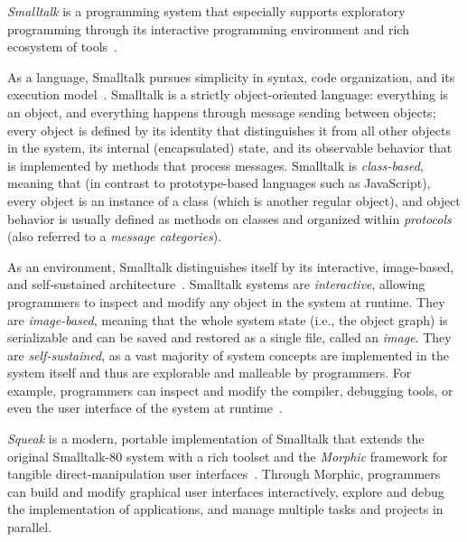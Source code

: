 \emph{Smalltalk} is a programming system that especially supports exploratory programming through its interactive programming environment and rich ecosystem of tools~\cite{ingalls2020evolution}.

As a language, Smalltalk pursues simplicity in syntax, code organization, and its execution model~\cite{goldberg1983smalltalk}.
Smalltalk is a strictly object-oriented language: everything is an object, and everything happens through message sending between objects; every object is defined by its identity that distinguishes it from all other objects in the system, its internal (encapsulated) state, and its observable behavior that is implemented by methods that process messages.
Smalltalk is \emph{class-based}, meaning that (in contrast to prototype-based languages such as JavaScript), every object is an instance of a class (which is another regular object), and object behavior is usually defined as methods on classes and organized within \emph{protocols} (also referred to a \emph{message categories}).

As an environment, Smalltalk distinguishes itself by its interactive, image-based, and self-sustained architecture~\cite{goldberg1984smalltalk}.
Smalltalk systems are \emph{interactive}, allowing programmers to inspect and modify any object in the system at runtime.
They are \emph{image-based}, meaning that the whole system state (i.e., the object graph) is serializable and can be saved and restored as a single file, called an \emph{image}.
They are \emph{self-sustained}, as a vast majority of system concepts are implemented in the system itself and thus are explorable and malleable by programmers.
For example, programmers can inspect and modify the compiler, debugging tools, or even the user interface of the system at runtime~\cite{taeumel2016evolving}.

\emph{Squeak} is a modern, portable implementation of Smalltalk that extends the original Smalltalk-80 system with a rich toolset and the \emph{Morphic} framework for tangible direct-manipulation user interfaces~\cite{ingalls1997back,ingalls2020evolution,thiede2023squeak}.
Through Morphic, programmers can build and modify graphical user interfaces interactively, explore and debug the implementation of applications, and manage multiple tasks and projects in parallel.

